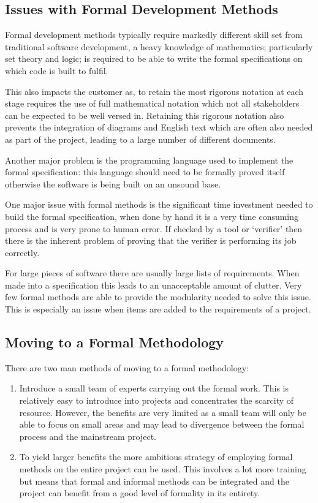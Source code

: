 \documentclass[10pt, a4paper, notitlepage, fleqn]{article}
\begin{document}
\subsection*{Issues with Formal Development Methods}
Formal development methods typically require markedly different skill set from traditional 
software development, a heavy knowledge of mathematics; particularly set theory and logic; is
required to be able to write the formal specifications on which code is built to fulfil. 

This also impacts the customer as, to retain the most rigorous notation at each stage requires the
use of full mathematical notation which not all stakeholders can be expected to be well versed in.
Retaining this rigorous notation also prevents the integration of diagrams and English text which 
are often also needed as part of the project, leading to a large number of different documents.

Another major problem is the programming language used to implement the formal specification:
this language should need to be formally proved itself otherwise the software is being built on an
unsound base.

One major issue with formal methods is the significant time investment needed to build the formal 
specification, when done by hand it is a very time consuming process and is very prone to human
error. If checked by a tool or `verifier' then there is the inherent problem of proving that the
verifier is performing its job correctly.

For large pieces of software there are usually large lists of requirements. When made into a 
specification this leads to an unacceptable amount of clutter. Very few formal methods are able
to provide the modularity needed to solve this issue. This is especially an issue when items are
added to the requirements of a project.

\subsection*{Moving to a Formal Methodology}
There are two man methods of moving to a formal methodology:

\begin{enumerate}
\item Introduce a small team of experts carrying out the formal work. This is relatively easy to 
introduce into projects and concentrates the scarcity of resource. However, the benefits are very
limited as a small team will only be able to focus on small areas and may lead to divergence 
between the formal process and the mainstream project.
\item To yield larger benefits the more ambitious strategy of employing formal methods on the 
entire project can be used. This involves a lot more training but means that formal and informal
methods can be integrated and the project can benefit from a good level of formality in its 
entirety.
\end{enumerate}
\end{document}
